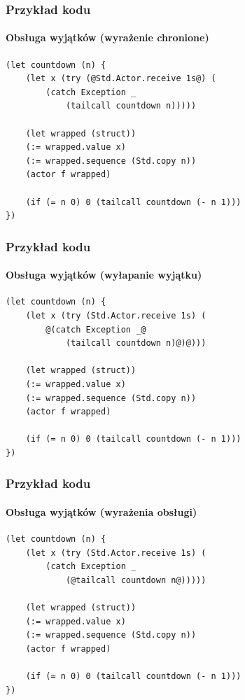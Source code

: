 \documentclass{beamer}
\begin{document}
\begin{frame}[fragile]
    \frametitle{Przykład kodu}
    \framesubtitle{Obsługa wyjątków (wyrażenie chronione)}

    \begin{small}
    \begin{lstlisting}
(let countdown (n) {
    (let x (try (@Std.Actor.receive 1s@) (
        (catch Exception _
            (tailcall countdown n)))))

    (let wrapped (struct))
    (:= wrapped.value x)
    (:= wrapped.sequence (Std.copy n))
    (actor f wrapped)

    (if (= n 0) 0 (tailcall countdown (- n 1)))
})
    \end{lstlisting}
    \end{small}
\end{frame}

\begin{frame}[fragile]
    \frametitle{Przykład kodu}
    \framesubtitle{Obsługa wyjątków (wyłapanie wyjątku)}

    \begin{small}
    \begin{lstlisting}
(let countdown (n) {
    (let x (try (Std.Actor.receive 1s) (
        @(catch Exception _@
            (tailcall countdown n)@)@)))

    (let wrapped (struct))
    (:= wrapped.value x)
    (:= wrapped.sequence (Std.copy n))
    (actor f wrapped)

    (if (= n 0) 0 (tailcall countdown (- n 1)))
})
    \end{lstlisting}
    \end{small}
\end{frame}

\begin{frame}[fragile]
    \frametitle{Przykład kodu}
    \framesubtitle{Obsługa wyjątków (wyrażenia obsługi)}

    \begin{small}
    \begin{lstlisting}
(let countdown (n) {
    (let x (try (Std.Actor.receive 1s) (
        (catch Exception _
            (@tailcall countdown n@)))))

    (let wrapped (struct))
    (:= wrapped.value x)
    (:= wrapped.sequence (Std.copy n))
    (actor f wrapped)

    (if (= n 0) 0 (tailcall countdown (- n 1)))
})
    \end{lstlisting}
    \end{small}
\end{frame}
\end{document}
